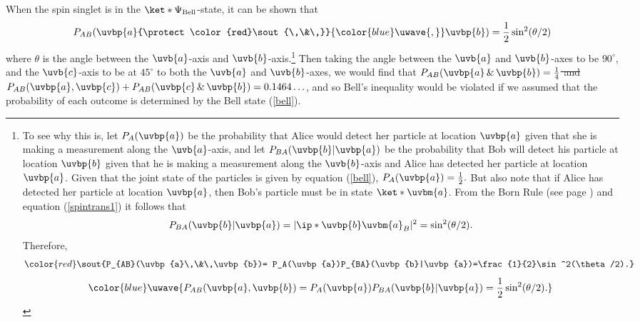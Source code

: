 \documentclass[12pt]{report}
\providecommand{\DIFadd}[1]{{\protect\color{blue}\uwave{#1}}} %
\providecommand{\DIFdel}[1]{{\protect\color{red}\sout{#1}}}                      %
\providecommand{\DIFaddbegin}{} %
\providecommand{\DIFaddend}{} %
\providecommand{\DIFdelbegin}{} %
\providecommand{\DIFdelend}{} %
\begin{document}
When the spin singlet is in the $\ket*{\Psi_{\text{Bell}}}$-state, it can be shown that 
      \begin{equation}\label{bellsin}
      P_{AB}(\uvbp{a}\DIFdelbegin \DIFdel{\,\&\,}\DIFdelend \DIFaddbegin \DIFadd{,}\DIFaddend \uvbp{b})=\frac{1}{2}\sin^2(\theta/2)
      \end{equation}
where $\theta$ is the angle between the $\uvb{a}$-axis and $\uvb{b}$-axis.\footnote{To see why this is, let $P_A(\uvbp{a})$ be the probability that Alice would detect her particle at location $\uvbp{a}$ given that she is making a measurement along the $\uvb{a}$-axis, and let $P_{BA}(\uvbp{b}|\uvbp{a})$ be the probability that Bob will detect his particle at location $\uvbp{b}$ given that he is making a measurement along the $\uvb{b}$-axis and Alice has detected her particle at location $\uvbp{a}$. Given that the joint state of the particles is given by equation (\ref{bell}), $P_A(\uvbp{a})=\frac{1}{2}.$ But also note that if  Alice has detected her particle at location $\uvbp{a}$, then Bob's particle must be in state $\ket*{\uvbm{a}}$. From the Born Rule (see page \pageref{bornrule}) and equation (\ref{spintrans1}) it follows that 
      $$P_{BA}(\uvbp{b}|\uvbp{a})= |\ip*{\uvbp{b}}{\uvbm{a}}_B|^2=\sin^2(\theta/2).$$ 
Therefore, 
\DIFdelbegin \begin{displaymath}\DIFdel{P_{AB}(\uvbp{a}\,\&\,\uvbp{b})= P_A(\uvbp{a})P_{BA}(\uvbp{b}|\uvbp{a})=\frac{1}{2}\sin^2(\theta/2).}\end{displaymath}%
\DIFdelend \DIFaddbegin $$\DIFadd{P_{AB}(\uvbp{a},\uvbp{b})= P_A(\uvbp{a})P_{BA}(\uvbp{b}|\uvbp{a})=\frac{1}{2}\sin^2(\theta/2).}$$\DIFaddend } 
Then taking the angle between the $\uvb{a}$ and $\uvb{b}$-axes to be $90^\circ$, and the $\uvb{c}$-axis to be at $45^\circ$ to both the $\uvb{a}$ and $\uvb{b}$-axes, we would find that \DIFdelbegin \DIFdel{$P_{AB}(\uvbp{a}\,\&\,\uvbp{b})=\frac{1}{4}$ and $P_{AB}(\uvbp{a},\uvbp{c})+P_{AB}(\uvbp{c}\,\&\,\uvbp{b})=0.1464\ldots$}\DIFdelend \DIFaddbegin \DIFadd{$P_{AB}(\uvbp{a},\uvbp{b})=\frac{1}{4}$ and $P_{AB}(\uvbp{a},\uvbp{c})+P_{AB}(\uvbp{c},\uvbp{b})=0.1464\ldots$}\DIFaddend , and so Bell's inequality would be violated if we assumed that the probability of each outcome is determined by the Bell state  (\ref{bell}). 


\end{document}

